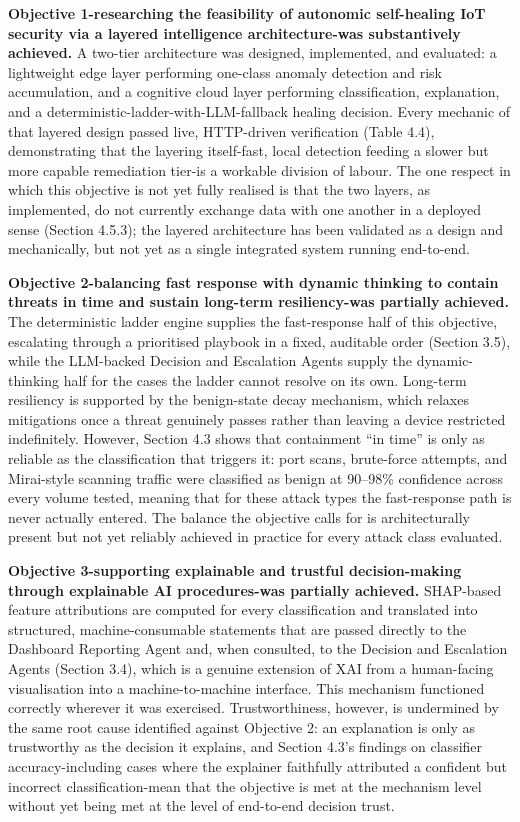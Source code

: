 \textbf{Objective 1-researching the feasibility of autonomic self-healing IoT security via a layered intelligence architecture-was substantively achieved.} A two-tier architecture was designed, implemented, and evaluated: a lightweight edge layer performing one-class anomaly detection and risk accumulation, and a cognitive cloud layer performing classification, explanation, and a deterministic-ladder-with-LLM-fallback healing decision. Every mechanic of that layered design passed live, HTTP-driven verification (Table 4.4), demonstrating that the layering itself-fast, local detection feeding a slower but more capable remediation tier-is a workable division of labour. The one respect in which this objective is not yet fully realised is that the two layers, as implemented, do not currently exchange data with one another in a deployed sense (Section 4.5.3); the layered architecture has been validated as a design and mechanically, but not yet as a single integrated system running end-to-end.

\textbf{Objective 2-balancing fast response with dynamic thinking to contain threats in time and sustain long-term resiliency-was partially achieved.} The deterministic ladder engine supplies the fast-response half of this objective, escalating through a prioritised playbook in a fixed, auditable order (Section 3.5), while the LLM-backed Decision and Escalation Agents supply the dynamic-thinking half for the cases the ladder cannot resolve on its own. Long-term resiliency is supported by the benign-state decay mechanism, which relaxes mitigations once a threat genuinely passes rather than leaving a device restricted indefinitely. However, Section 4.3 shows that containment ``in time'' is only as reliable as the classification that triggers it: port scans, brute-force attempts, and Mirai-style scanning traffic were classified as benign at 90--98\% confidence across every volume tested, meaning that for these attack types the fast-response path is never actually entered. The balance the objective calls for is architecturally present but not yet reliably achieved in practice for every attack class evaluated.

\textbf{Objective 3-supporting explainable and trustful decision-making through explainable AI procedures-was partially achieved.} SHAP-based feature attributions are computed for every classification and translated into structured, machine-consumable statements that are passed directly to the Dashboard Reporting Agent and, when consulted, to the Decision and Escalation Agents (Section 3.4), which is a genuine extension of XAI from a human-facing visualisation into a machine-to-machine interface. This mechanism functioned correctly wherever it was exercised. Trustworthiness, however, is undermined by the same root cause identified against Objective 2: an explanation is only as trustworthy as the decision it explains, and Section 4.3's findings on classifier accuracy-including cases where the explainer faithfully attributed a confident but incorrect classification-mean that the objective is met at the mechanism level without yet being met at the level of end-to-end decision trust.

